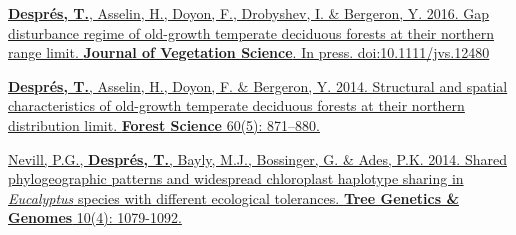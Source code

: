 \begin{cventries}
  \cventry
    {}
    {}
    {}
    {}
    {
      \begin{cvitems}
          \setlength{\itemindent}{-2em}
        \item[] {\href{http://onlinelibrary.wiley.com/doi/10.1111/jvs.12480/full}{{\normalsize \textbf{Després, T.}, Asselin, H., Doyon,
              F., Drobyshev, I. \& Bergeron, Y. 2016. Gap disturbance
              regime of old-growth temperate deciduous forests at
              their northern range limit. \textbf{Journal of Vegetation
              Science}. In press. doi:10.1111/jvs.12480}}}
      \item[]{}
                      \item[] {\href{http://www.ingentaconnect.com/content/saf/fs/2014/00000060/00000005/art00007}{{\normalsize \textbf{Després, T.}, Asselin, H., Doyon,
                  F. \& Bergeron, Y. 2014. Structural and spatial
                  characteristics of old-growth temperate deciduous
                  forests at their northern distribution limit. \textbf{Forest
                    Science} 60(5): 871–880.}}}
                        \item[]{}
                \item[] {\href{http://link.springer.com/article/10.1007/s11295-014-0744-y}{{\normalsize Nevill, P.G., \textbf{Després, T.}, Bayly, M.J., Bossinger, G. \& Ades, P.K. 2014. Shared phylogeographic patterns and widespread chloroplast haplotype sharing in \textit{Eucalyptus} species with different ecological tolerances. \textbf{Tree Genetics \& Genomes} 10(4): 1079-1092.}}}
                        \end{cvitems}
    }
 
  \end{cventries}
